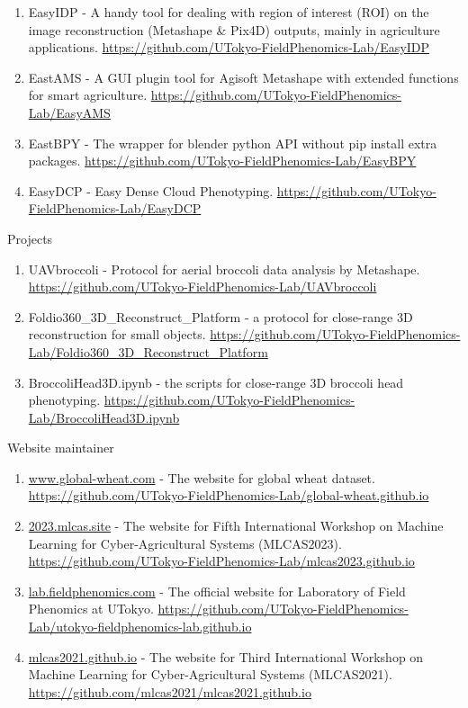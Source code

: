 \begin{singlespace}
\begin{enumerate}
  \item EasyIDP - A handy tool for dealing with region of interest (ROI) on the image reconstruction (Metashape \& Pix4D) outputs, mainly in agriculture applications. \url{https://github.com/UTokyo-FieldPhenomics-Lab/EasyIDP}
  \item EastAMS - A GUI plugin tool for Agisoft Metashape with extended functions for smart agriculture. \url{https://github.com/UTokyo-FieldPhenomics-Lab/EasyAMS}
  \item EastBPY - The wrapper for blender python API without pip install extra packages. \url{https://github.com/UTokyo-FieldPhenomics-Lab/EasyBPY}
  \item EasyDCP - Easy Dense Cloud Phenotyping. \url{https://github.com/UTokyo-FieldPhenomics-Lab/EasyDCP}
\end{enumerate}

\noindent
Projects

\begin{enumerate}
  \item UAVbroccoli - Protocol for aerial broccoli data analysis by Metashape. \url{https://github.com/UTokyo-FieldPhenomics-Lab/UAVbroccoli}
  \item Foldio360\_3D\_Reconstruct\_Platform - a protocol for close-range 3D reconstruction for small objects. \url{https://github.com/UTokyo-FieldPhenomics-Lab/Foldio360_3D_Reconstruct_Platform}
  \item BroccoliHead3D.ipynb - the scripts for close-range 3D broccoli head phenotyping. \url{https://github.com/UTokyo-FieldPhenomics-Lab/BroccoliHead3D.ipynb}
\end{enumerate}

\noindent
Website maintainer

\begin{enumerate}
  \item \url{www.global-wheat.com} - The website for global wheat dataset. \url{https://github.com/UTokyo-FieldPhenomics-Lab/global-wheat.github.io}
  \item \url{2023.mlcas.site} - The website for Fifth International Workshop on Machine Learning for Cyber-Agricultural Systems (MLCAS2023). \url{https://github.com/UTokyo-FieldPhenomics-Lab/mlcas2023.github.io}
  \item \url{lab.fieldphenomics.com} - The official website for Laboratory of Field Phenomics at UTokyo. \url{https://github.com/UTokyo-FieldPhenomics-Lab/utokyo-fieldphenomics-lab.github.io}
  \item \url{mlcas2021.github.io} - The website for Third International Workshop on Machine Learning for Cyber-Agricultural Systems (MLCAS2021). \url{https://github.com/mlcas2021/mlcas2021.github.io}
\end{enumerate}

\end{singlespace}
